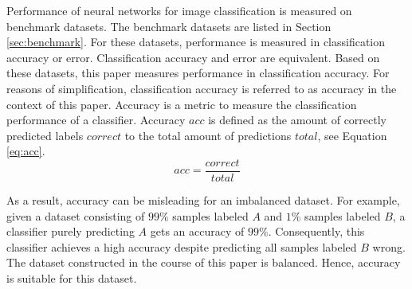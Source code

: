 Performance of neural networks for image classification is measured on benchmark datasets. The benchmark datasets are listed in Section \ref{sec:benchmark}. For these datasets, performance is measured in classification accuracy or error.\autocites{imagenet.2019}{cifar.2012}{mnist.2010}{svhn.2011}{clothing.2016}{fashionMNIST.2017}{Darlow.2018}{food.2014}{vanHorn.2018}{stanfordcars.2013}{emnistletters.2017}{kuzushijiMNIST.2018}{cub.2011}{Sabour.2017}{isic1.2019}{isic2.2018}{isic3.2018}
Classification accuracy and error are equivalent.\autocite{Bansal.2019b}
Based on these datasets, this paper measures performance in classification accuracy. For reasons of simplification, classification accuracy is referred to as accuracy in the context of this paper. Accuracy is a metric to measure the classification performance of a classifier. Accuracy $acc$ is defined as the amount of correctly predicted labels $correct$ to the total amount of predictions $total$, see Equation \eqref{eq:acc}. \autocite{Bansal.2019b}
\begin{equation}
\label{eq:acc}
acc = \frac{correct}{total}
\end{equation}
\par
As a result, accuracy can be misleading for an imbalanced dataset. For example, given a dataset consisting of $99\%$ samples labeled $A$ and $1\%$ samples labeled $B$, a classifier purely predicting $A$ gets an accuracy of $99\%$. Consequently, this classifier achieves a high accuracy despite predicting all samples labeled $B$ wrong.
The dataset constructed in the course of this paper is balanced. Hence, accuracy is suitable for this dataset.
